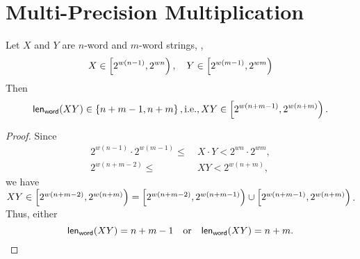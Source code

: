\newpage
\section{Multi-Precision Multiplication}
\begin{note} Let $X$ and $Y$ are $n$-word and $m$-word strings, \ie, \[
X\in\intco{2^{w(n-1)},2^{wn}},\quad
Y\in\intco{2^{w(m-1)},2^{wm}}
\] Then
\[\len_\word(XY)\in\set{n+m-1, n+m}, \ie, XY\in\intco{2^{w(n+m-1)},2^{w(n+m)}}.
\]
\begin{proof}
	Since \begin{align*}
		2^{w(n-1)}\cdot 2^{w(m-1)}\leq&\ X\cdot Y<2^{wn}\cdot 2^{wm},\\
		2^{w(n+m-2)}\leq&\ XY<2^{w(n+m)},
	\end{align*} we have $XY\in\intco{2^{w(n+m-2)}, 2^{w(n+m)}}=\intco{2^{w(n+m-2)}, 2^{w(n+m-1)}}\cup\intco{2^{w(n+m-1)}, 2^{w(n+m)}}$. Thus, either \[
	\mathsf{len}_{\mathsf{word}}(XY)=n+m-1\quad\text{or}\quad\mathsf{len}_{\mathsf{word}}(XY)=n+m.
	\]
\end{proof}
\end{note}

